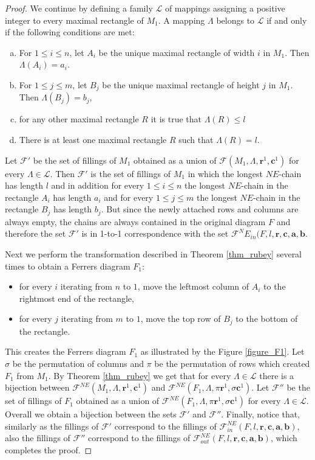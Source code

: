 \begin{proof}
We continue by defining a family $\mathcal{L}$ of mappings assigning a positive integer to every maximal rectangle of $M_1$.
A mapping $\Lambda$ belongs to $\mathcal{L}$ if and only if the following conditions are met:
\begin{enumerate}[(a)]
\item For $1 \leq i \leq n$, let $A_i$ be the unique maximal rectangle of width $i$ in $M_1$. Then $\Lambda(A_i) = a_i$.
\item For $1 \leq j \leq m$, let $B_j$ be the unique maximal rectangle of height $j$ in $M_1$. Then $\Lambda(B_j) = b_j$,
\item for any other maximal rectangle $R$ it is true that $\Lambda(R) \leq l$ 
\item There is at least one maximal rectangle $R$ such that $\Lambda(R) = l$.
\end{enumerate}

Let $\mathcal{F}'$ be the set of fillings of $M_1$ obtained as a union of $\mathcal{F}(M_1, \Lambda, \bm{r}^1, \bm{c}^1)$ for every
$\Lambda \in \mathcal{L}$. Then $\mathcal{F}'$ is the set of fillings of $M_1$ in which the longest $NE$-chain has length $l$
and in addition for every $1 \leq i \leq n$ the longest $NE$-chain in the rectangle $A_i$ has length $a_i$
and for every $1 \leq j \leq m$ the longest $NE$-chain in the rectangle $B_j$ has length $b_j$. But since the newly attached
rows and columns are always empty, the chains are always contained in the original diagram $F$ and therefore the set
$\mathcal{F}'$ is in 1-to-1 correspondence with the set $\mathcal{F}^NE_{in}(F, l, \bm{r}, \bm{c}, \bm{a}, \bm{b}$.

Next we perform the transformation described in Theorem \ref{thm_rubey} several times to obtain a Ferrers diagram $F_1$:
\begin{itemize}
\item for every $i$ iterating from $n$ to $1$, move the leftmost column of $A_i$ to the rightmost end of the rectangle,
\item for every $j$ iterating from $m$ to $1$, move the top row of $B_j$ to the bottom of the rectangle.
\end{itemize}
This creates the Ferrers diagram $F_1$ as illustrated by the Figure \ref{figure_F1}.
Let $\sigma$ be the permutation of columns and $\pi$ be the permutation of rows which created $F_1$ from $M_1$. By
Theorem \ref{thm_rubey} we get that for every $\Lambda \in \mathcal{L}$ there is a bijection between 
$\mathcal{F}^{NE}(M_1, \Lambda, \bm{r}^1, \bm{c}^1)$ and $\mathcal{F}^{NE}(F_1, \Lambda, \pi\bm{r}^1, \sigma\bm{c}^1)$.
Let $\mathcal{F}''$ be the set of fillings of $F_1$ obtained as a union of $\mathcal{F}^{NE}(F_1, \Lambda, \pi\bm{r}^1, \sigma\bm{c}^1)$
for every $\Lambda \in \mathcal{L}$. Overall we obtain a bijection between the sets $\mathcal{F}'$ and $\mathcal{F}''$.
Finally, notice that, similarly as the fillings of $\mathcal{F}'$ correspond to the fillings
of $\mathcal{F}^{NE}_{in}(F, l, \bm{r}, \bm{c}, \bm{a}, \bm{b})$,
also the fillings of $\mathcal{F}''$ correspond to the fillings of $\mathcal{F}^{NE}_{out}(F, l, \bm{r}, \bm{c}, \bm{a}, \bm{b})$,
which completes the proof.


\end{proof}
